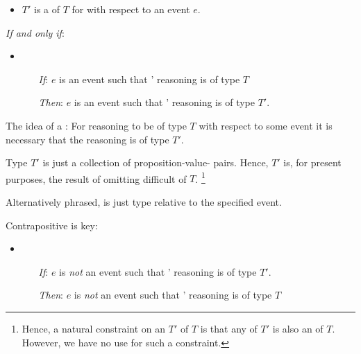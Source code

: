 \begin{note}
  \begin{definition}[\rotor{2}]
    \label{def:rotor}

    \begin{itemize}
    \item
      \(T'\) is a \emph{} of \(T\) for \vAgent{} with respect to an event \(e\).
    \end{itemize}

    \emph{If and only if}:

    \begin{itemize}
    \item
      \begin{itemize}
      \item[\emph{If}:]
        \(e\) is an event such that \vAgent{}' reasoning is of type \(T\)
      \item[\emph{Then}:]
        \(e\) is an event such that \vAgent{}' reasoning is of type \(T'\).
      \end{itemize}
    \end{itemize}
    \vspace{-\baselineskip}
  \end{definition}

  The idea of a \tRep{}:
  For reasoning to be of type \(T\) with respect to some event it is necessary that the reasoning is of type \(T'\).

  Type \(T'\) is just a collection of proposition-value-\pool{} pairs.
  Hence, \(T'\) is, for present purposes, the result of omitting difficult  of \(T\).%
  \footnote{
    Hence, a natural constraint on an \tRep{} \(T'\) of \(T\) is that any \tI{} of \(T'\) is also an \tI{} of \(T\).
    However, we have no use for such a constraint.
  }

  Alternatively phrased, \rotor{} is just type relative to the specified event.

  Contrapositive is key:

      \begin{itemize}
    \item
      \begin{itemize}
      \item[\emph{If}:]
        \(e\) is \emph{not} an event such that \vAgent{}' reasoning is of type \(T'\).
      \item[\emph{Then}:]
        \(e\) is \emph{not} an event such that \vAgent{}' reasoning is of type \(T\)
      \end{itemize}
    \end{itemize}



\end{note}
